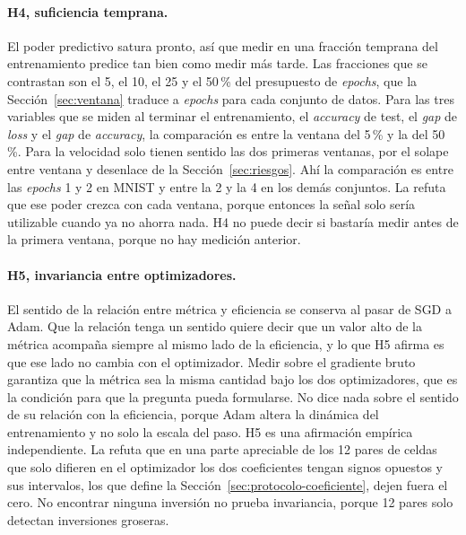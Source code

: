 \paragraph{H4, suficiencia temprana.} El poder predictivo satura pronto, así que medir en una fracción temprana del entrenamiento predice tan bien como medir más tarde. Las fracciones que se contrastan son el 5, el 10, el 25 y el 50\,\% del presupuesto de \emph{epochs}, que la Sección~\ref{sec:ventana} traduce a \emph{epochs} para cada conjunto de datos. Para las tres variables que se miden al terminar el entrenamiento, el \emph{accuracy} de test, el \emph{gap} de \emph{loss} y el \emph{gap} de \emph{accuracy}, la comparación es entre la ventana del 5\,\% y la del 50\,\%. Para la velocidad solo tienen sentido las dos primeras ventanas, por el solape entre ventana y desenlace de la Sección~\ref{sec:riesgos}. Ahí la comparación es entre las \emph{epochs} 1 y 2 en MNIST y entre la 2 y la 4 en los demás conjuntos. La refuta que ese poder crezca con cada ventana, porque entonces la señal solo sería utilizable cuando ya no ahorra nada. H4 no puede decir si bastaría medir antes de la primera ventana, porque no hay medición anterior.

\paragraph{H5, invariancia entre optimizadores.} El sentido de la relación entre métrica y eficiencia se conserva al pasar de SGD a Adam. Que la relación tenga un sentido quiere decir que un valor alto de la métrica acompaña siempre al mismo lado de la eficiencia, y lo que H5 afirma es que ese lado no cambia con el optimizador. Medir sobre el gradiente bruto garantiza que la métrica sea la misma cantidad bajo los dos optimizadores, que es la condición para que la pregunta pueda formularse. No dice nada sobre el sentido de su relación con la eficiencia, porque Adam altera la dinámica del entrenamiento y no solo la escala del paso. H5 es una afirmación empírica independiente. La refuta que en una parte apreciable de los 12 pares de celdas que solo difieren en el optimizador los dos coeficientes tengan signos opuestos y sus intervalos, los que define la Sección~\ref{sec:protocolo-coeficiente}, dejen fuera el cero. No encontrar ninguna inversión no prueba invariancia, porque 12 pares solo detectan inversiones groseras.

